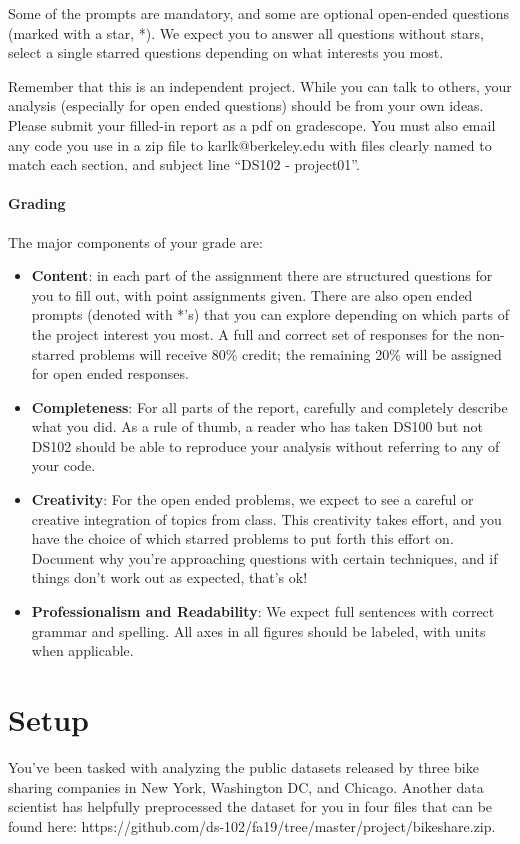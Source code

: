 \documentclass[12pt, answers, addpoints]{exam}
\begin{document}
Some of the prompts are mandatory, and some are optional open-ended questions (marked with a star, *). We expect you to answer all questions without stars, select a single starred questions depending on what interests you most.

Remember that this is an independent project. While you can talk to others, your analysis (especially for open ended questions) should be from your own ideas. Please submit your filled-in report as a pdf on gradescope. You must also email any code you use in a zip file to karlk@berkeley.edu with files clearly named to match each section, and subject line ``DS102 - project01''. 

\paragraph{Grading}
The major components of your grade are:
\begin{itemize}
\item \textbf{Content}: in each part of the assignment there are structured questions for you to fill out, with point assignments given. There are also open ended prompts (denoted with *'s) that you can explore depending on which parts of the project interest you most. A full and correct set of responses for the non-starred problems will receive 80\% credit; the remaining 20\% will be assigned for open ended responses. 
\item \textbf{Completeness}: For all parts of the report, carefully and completely describe what you did. As a rule of thumb, a reader who has taken DS100 but not DS102 should be able to reproduce your analysis without referring to any of your code. 
\item \textbf{Creativity}: For the open ended problems, we expect to see a careful or creative integration of topics from class. This creativity takes effort, and you have the choice of which starred problems to put forth this effort on. Document why you're approaching questions with certain techniques, and if things don't work out as expected, that's ok!
\item \textbf{Professionalism and Readability}: We expect full sentences with correct grammar and spelling. All axes in all figures should be labeled, with units when applicable. 
\end{itemize}



\clearpage
\section*{Setup}
 You've been tasked with analyzing the public datasets released by three bike sharing companies in New York, Washington DC, and Chicago. Another data scientist has helpfully preprocessed the dataset for you in four files that can be found here: https://github.com/ds-102/fa19/tree/master/project/bikeshare.zip.
\end{document}

